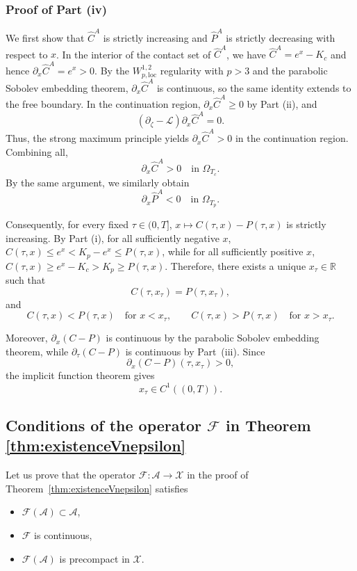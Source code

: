 \documentclass[11pt, a4paper, leqno]{amsart}
\numberwithin{equation}{section}
\theoremstyle{plain}
\theoremstyle{definition}
\theoremstyle{remark}
\def\leq{\leqslant}
\def\geq{\geqslant}
\begin{document}
{
\subsubsection*{Proof of Part (iv)}

We first show that $\widehat C^A$ is strictly increasing and
$\widehat P^A$ is strictly decreasing with respect to $x$.
In the interior of the contact set of $\widehat C^A$, we have
$\widehat C^A=e^x-K_c$ and hence
$\partial_x\widehat C^A=e^x>0$.
By the $W^{1,2}_{p,\mathrm{loc}}$ regularity with $p>3$ and the
parabolic Sobolev embedding theorem,
$\partial_x\widehat C^A$ is continuous, so the same identity extends
to the free boundary. In the continuation region,
$\partial_x\widehat C^A\geq0$ by Part (ii), and
\[
    (\partial_\zeta-\mathcal L)
    \partial_x\widehat C^A=0.
\]
Thus, the strong maximum principle \cite[Corollary 2.4]{FRA04} yields $\partial_x\widehat C^A>0$ in the continuation region.
Combining all,
\[
    \partial_x\widehat C^A>0
    \quad\text{in }\Omega_{T_c}.
\]
By the same argument, we similarly obtain
\[
    \partial_x\widehat P^A<0
    \quad\text{in }\Omega_{T_p}.
\]

Consequently, for every fixed $\tau\in(0,T]$,
$x\mapsto C(\tau,x)-P(\tau,x)$ is strictly increasing.
By Part (i), for all sufficiently negative $x$,
$C(\tau,x)\leq e^x<K_p-e^x\leq P(\tau,x)$, while for all
sufficiently positive $x$,
$C(\tau,x)\geq e^x-K_c>K_p\geq P(\tau,x)$.
Therefore, there exists a unique $x_\tau\in\mathbb R$ such that
\[
    C(\tau,x_\tau)=P(\tau,x_\tau),
\]
and
\[
    C(\tau,x)<P(\tau,x)
    \quad\text{for }x<x_\tau,
    \qquad
    C(\tau,x)>P(\tau,x)
    \quad\text{for }x>x_\tau.
\]}
{
Moreover, $\partial_x(C-P)$ is continuous by the parabolic Sobolev
embedding theorem, while $\partial_\tau(C-P)$ is continuous by
Part~(iii). Since
\[
    \partial_x(C-P)(\tau,x_\tau)>0,
\]
the implicit function theorem gives
\[
    x_\tau\in C^1((0,T)).
\]
}

\subsection{Conditions of the operator \texorpdfstring{$\mathcal{F}$}{F} in Theorem \ref{thm:existenceVnepsilon}}\label{Appendix.D}

Let us prove that the operator $\mathcal{F}:\mathcal{A} \to \mathcal{X}$ in the proof of Theorem~\ref{thm:existenceVnepsilon} satisfies 
\begin{itemize}
    \item[\textbf{(1)}] $\mathcal{F}(\mathcal{A})\subset \mathcal{A}$,
    \item[\textbf{(2)}] $\mathcal{F}$ is continuous,
    \item[\textbf{(3)}] $\mathcal{F}(\mathcal{A})$ is precompact in $\mathcal{X}$.
\end{itemize}
\end{document}
